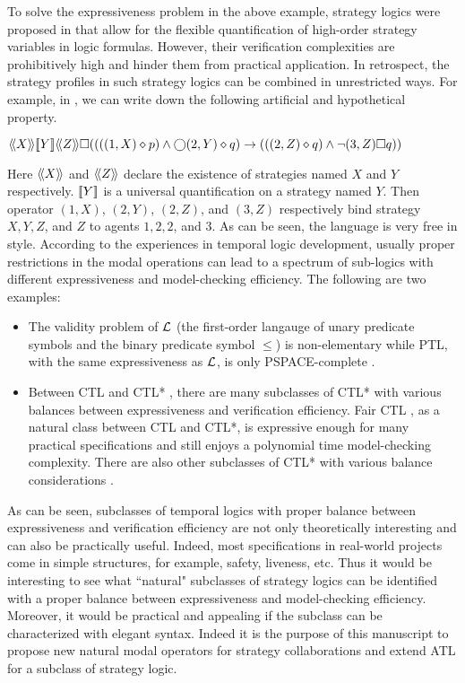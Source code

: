 \label{reply2.motive1} 
To solve the expressiveness problem in the above example, 
strategy logics were proposed in \cite{CLM10,CHP10,MMV10} that 
allow for the flexible quantification of high-order 
strategy variables in logic formulas.  
However, their verification complexities are prohibitively high 
and hinder them from practical application.  
In retrospect, the strategy profiles in such strategy logics 
can be combined in unrestricted ways.  
For example, in \cite{MMV10}, we can 
write down the following artificial and hypothetical property.  
\begin{center} 
$\langle\!\langle X\rangle\!\rangle [\![ Y]\!]\langle\!\langle Z\rangle\!\rangle 
\square ((((1,X)\diamond p) \wedge \bigcirc (2,Y) \diamond q)\rightarrow
(((2,Z)\diamond q)\wedge\neg(3,Z)\square q))$
\end{center} 
Here $\langle\!\langle X\rangle\!\rangle$ and $\langle\!\langle Z\rangle\!\rangle$ declare the 
existence of strategies named $X$ and $Y$ respectively.  
$[\![ Y]\!]$ is a universal quantification on a strategy named $Y$.  
Then operator $(1,X)$, $(2,Y)$, $(2,Z)$, and $(3,Z)$ 
respectively bind strategy $X, Y, Z$, and $Z$ to agents $1, 2, 2$, and $3$.  
As can be seen, the language is very free in style.  
According to the experiences in temporal logic development, 
usually proper restrictions in the modal operations can lead to 
a spectrum of sub-logics with different expressiveness and model-checking efficiency.  
The following are two examples: 
\begin{itemize} 
\item The validity problem of $\cal L$ (the first-order langauge of 
  unary predicate symbols and the binary predicate symbol $\leq$) 
  is non-elementary \cite{Stockmeyer74} while 
  PTL, with the same expressiveness as $\cal L$, is only PSPACE-complete \cite{SC85}.  
\item Between CTL \cite{CES86} and CTL* \cite{EH85,EH86}, there are many subclasses of CTL* with various balances 
  between expressiveness and verification efficiency.  
  Fair CTL \cite{EL87}, as a natural class between CTL and CTL*, 
  is expressive enough for many practical specifications and 
  still enjoys a polynomial time model-checking complexity.  
  There are also other subclasses of CTL* with various balance considerations \cite{BPM83,EC80,EH86,Lamport80}.  
\end{itemize} 
As can be seen, subclasses of temporal logics with proper balance between 
expressiveness and verification efficiency are not only theoretically interesting and 
can also be practically useful.  
Indeed, most specifications in real-world projects come 
in simple structures, for example, safety, liveness, etc. 
Thus it would be interesting to see what ``natural" subclasses of strategy logics 
can be identified with a proper balance between expressiveness and model-checking efficiency.  
Moreover, it would be practical and appealing if the subclass 
can be characterized with elegant syntax.  
Indeed it is the purpose of this manuscript to propose new natural modal operators 
for strategy collaborations and extend ATL for a subclass of strategy logic.  
\label{reply2.motive2}

